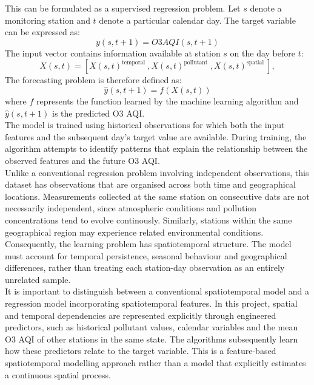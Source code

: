 \documentclass[11pt,a4paper]{article}
\begin{document}
\noindent
This can be formulated as a supervised regression problem. Let $s$ denote a monitoring station and $t$ denote a particular calendar day. The target variable can be expressed as:
\begin{equation}
    y(s, t+1)=O3AQI(s, t+1)
\end{equation}
The input vector contains information available at station $s$ on the day before $t$:
\begin{equation}
    X(s,t)=\left[X(s,t)^{\text{temporal }},X(s,t)^{\text{pollutant }}, X(s,t)^{\text{spatial }}\right],
\end{equation}
The forecasting problem is therefore defined as:
\begin{equation}
    \hat{y}(s, t+1)=f(X(s,t))
\end{equation}
where $f$ represents the function learned by the machine learning algorithm and $\hat{y}(s, t+1)$ is the predicted O3 AQI.\\

\noindent
The model is trained using historical observations for which both the input features and the subsequent day's target value are available. During training, the algorithm attempts to identify patterns that explain the relationship between the observed features and the future O3 AQI.\\

\noindent
Unlike a conventional regression problem involving independent observations, this dataset has observations that are organised across both time and geographical locations. Measurements collected at the same station on consecutive dats are not necessarily independent, since atmospheric conditions and pollution concentrations tend to evolve continously. Similarly, stations within the same geographical region may experience related environmental conditions.\\

\noindent
Consequently, the learning problem has spatiotemporal structure. The model must account for temporal persistence, seasonal behaviour and geographical differences, rather than treating each station-day observation as an entirely unrelated sample.\\

\noindent
It is important to distinguish between a conventional spatiotemporal model and a regression model incorporating spatiotemporal features. In this project, spatial and temporal dependencies are represented explicitly through engineered predictors, such as historical pollutant values, calendar variables and the mean O3 AQI of other stations in the same state. The algorithms subsequently learn how these predictors relate to the target variable. This is a feature-based spatiotemporal modelling approach rather than a model that explicitly estimates a continuous spatial process.\\
\end{document}
